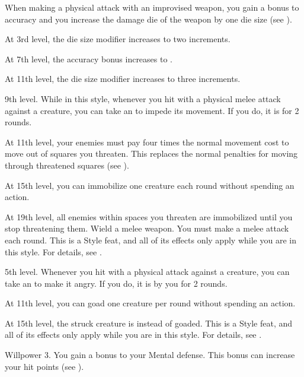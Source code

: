     \featben When making a physical attack with an improvised weapon, you gain a  bonus to accuracy and you increase the damage die of the weapon by one die size (see ).

    At 3rd level, the die size modifier increases to two increments.

    At 7th level, the accuracy bonus increases to .

    At 11th level, the die size modifier increases to three increments.

    \featpre 9th level.
    \featben While in this style, whenever you hit with a physical melee attack against a creature, you can take an  to impede its movement.
    If you do, it is \immobilized for 2 rounds.

    At 11th level, your enemies must pay four times the normal movement cost to move out of squares you threaten.
    This replaces the normal penalties for moving through threatened squares (see ).

    At 15th level, you can immobilize one creature each round without spending an action.

    At 19th level, all enemies within spaces you threaten are immobilized until you stop threatening them.
    \stylereq Wield a melee weapon.
    You must make a melee attack each round.
     This is a Style feat, and all of its effects only apply while you are in this style.
    For details, see .

    \featpre 5th level.
    \featben Whenever you hit with a physical attack against a creature, you can take an  to make it angry.
    If you do, it is \goaded by you for 2 rounds.

    At 11th level, you can goad one creature per round without spending an action.

    At 15th level, the struck creature is \taunted instead of goaded.
     This is a Style feat, and all of its effects only apply while you are in this style.
    For details, see .

    \featpre Willpower 3.
    \featben You gain a  bonus to your Mental defense.
    This bonus can increase your hit points (see ).

